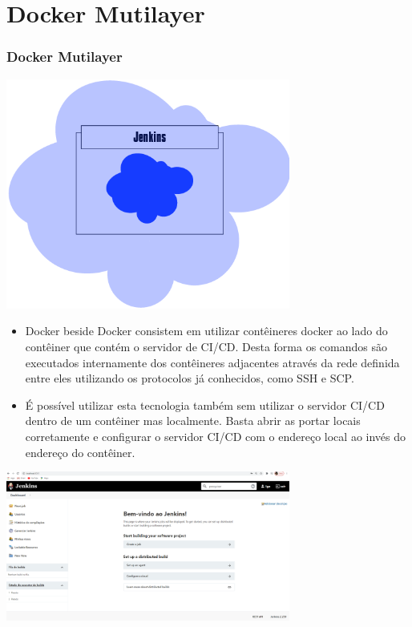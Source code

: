 \documentclass[10pt]{beamer}
\theoremstyle{remark}
\theoremstyle{definition}
\begin{document}
\section{Docker Mutilayer}
\begin{frame}[allowframebreaks]
\frametitle{Docker Mutilayer}
	
	\begin{center}
		\includegraphics[width=0.7\textwidth]{images/40.png}
	\end{center}
	
	\framebreak
	
	\begin{itemize}
	
		\item Docker beside Docker consistem em utilizar contêineres docker ao lado do contêiner que contém o servidor de CI/CD. Desta forma os comandos são executados internamente dos contêineres adjacentes através da rede definida entre eles utilizando os protocolos já conhecidos, como SSH e SCP.
		
		\item É possível utilizar esta tecnologia também sem utilizar o servidor CI/CD dentro de um contêiner mas localmente. Basta abrir as portar locais corretamente e configurar o servidor CI/CD com o endereço local ao invés do endereço do contêiner.
		
	\end{itemize}
	
	\framebreak
	
	\begin{center}
		\includegraphics[width=0.7\textwidth]{images/43.png}
	\end{center}
	

\end{frame}
\end{document}
